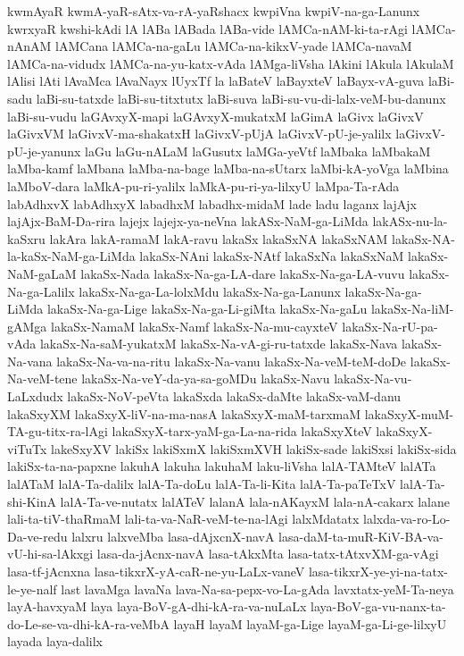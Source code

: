 {kwmAyaR
kwmA-yaR-sAtx-va-rA-yaRshacx
kwpiVna
kwpiV-na-ga-Lanunx
kwrxyaR
kwshi-kAdi
lA
lABa
lABada
lABa-vide
lAMCa-nAM-ki-ta-rAgi
lAMCa-nAnAM
lAMCana
lAMCa-na-gaLu
lAMCa-na-kikxV-yade
lAMCa-navaM
lAMCa-na-vidudx
lAMCa-na-yu-katx-vAda
lAMga-liVsha
lAkini
lAkula
lAkulaM
lAlisi
lAti
lAvaMca
lAvaNayx
lUyxTf
la
laBateV
laBayxteV
laBayx-vA-guva
laBi-sadu
laBi-su-tatxde
laBi-su-titxtutx
laBi-suva
laBi-su-vu-di-lalx-veM-bu-danunx
laBi-su-vudu
laGAvxyX-mapi
laGAvxyX-mukatxM
laGimA
laGivx
laGivxV
laGivxVM
laGivxV-ma-shakatxH
laGivxV-pUjA
laGivxV-pU-je-yalilx
laGivxV-pU-je-yanunx
laGu
laGu-nALaM
laGusutx
laMGa-yeVtf
laMbaka
laMbakaM
laMba-kamf
laMbana
laMba-na-bage
laMba-na-sUtarx
laMbi-kA-yoVga
laMbina
laMboV-dara
laMkA-pu-ri-yalilx
laMkA-pu-ri-ya-lilxyU
laMpa-Ta-rAda
labAdhxvX
labAdhxyX
labadhxM
labadhx-midaM
lade
ladu
laganx
lajAjx
lajAjx-BaM-Da-rira
lajejx
lajejx-ya-neVna
lakASx-NaM-ga-LiMda
lakASx-nu-la-kaSxru
lakAra
lakA-ramaM
lakA-ravu
lakaSx
lakaSxNA
lakaSxNAM
lakaSx-NA-la-kaSx-NaM-ga-LiMda
lakaSx-NAni
lakaSx-NAtf
lakaSxNa
lakaSxNaM
lakaSx-NaM-gaLaM
lakaSx-Nada
lakaSx-Na-ga-LA-dare
lakaSx-Na-ga-LA-vuvu
lakaSx-Na-ga-Lalilx
lakaSx-Na-ga-La-lolxMdu
lakaSx-Na-ga-Lanunx
lakaSx-Na-ga-LiMda
lakaSx-Na-ga-Lige
lakaSx-Na-ga-Li-giMta
lakaSx-Na-gaLu
lakaSx-Na-liM-gAMga
lakaSx-NamaM
lakaSx-Namf
lakaSx-Na-mu-cayxteV
lakaSx-Na-rU-pa-vAda
lakaSx-Na-saM-yukatxM
lakaSx-Na-vA-gi-ru-tatxde
lakaSx-Nava
lakaSx-Na-vana
lakaSx-Na-va-na-ritu
lakaSx-Na-vanu
lakaSx-Na-veM-teM-doDe
lakaSx-Na-veM-tene
lakaSx-Na-veY-da-ya-sa-goMDu
lakaSx-Navu
lakaSx-Na-vu-LaLxdudx
lakaSx-NoV-peVta
lakaSxda
lakaSx-daMte
lakaSx-vaM-danu
lakaSxyXM
lakaSxyX-liV-na-ma-nasA
lakaSxyX-maM-tarxmaM
lakaSxyX-muM-TA-gu-titx-ra-lAgi
lakaSxyX-tarx-yaM-ga-La-na-rida
lakaSxyXteV
lakaSxyX-viTuTx
lakeSxyXV
lakiSx
lakiSxmX
lakiSxmXVH
lakiSx-sade
lakiSxsi
lakiSx-sida
lakiSx-ta-na-papxne
lakuhA
lakuha
lakuhaM
laku-liVsha
lalA-TAMteV
lalATa
lalATaM
lalA-Ta-dalilx
lalA-Ta-doLu
lalA-Ta-li-Kita
lalA-Ta-paTeTxV
lalA-Ta-shi-KinA
lalA-Ta-ve-nutatx
lalATeV
lalanA
lala-nAKayxM
lala-nA-cakarx
lalane
lali-ta-tiV-thaRmaM
lali-ta-va-NaR-veM-te-na-lAgi
lalxMdatatx
lalxda-va-ro-Lo-Da-ve-redu
lalxru
lalxveMba
lasa-dAjxcnX-navA
lasa-daM-ta-muR-KiV-BA-va-vU-hi-sa-lAkxgi
lasa-da-jAcnx-navA
lasa-tAkxMta
lasa-tatx-tAtxvXM-ga-vAgi
lasa-tf-jAcnxna
lasa-tikxrX-yA-caR-ne-yu-LaLx-vaneV
lasa-tikxrX-ye-yi-na-tatx-le-ye-nalf
last
lavaMga
lavaNa
lava-Na-sa-pepx-vo-La-gAda
lavxtatx-yeM-Ta-neya
layA-havxyaM
laya
laya-BoV-gA-dhi-kA-ra-va-nuLaLx
laya-BoV-ga-vu-nanx-ta-do-Le-se-va-dhi-kA-ra-veMbA
layaH
layaM
layaM-ga-Lige
layaM-ga-Li-ge-lilxyU
layada
laya-dalilx
}
